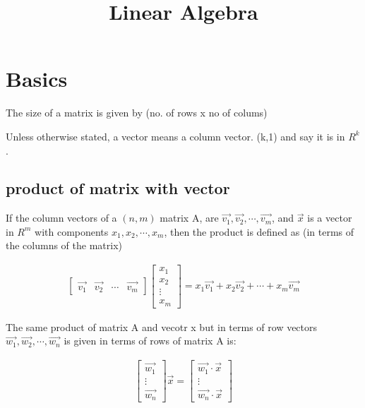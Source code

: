\documentclass[10pt,a4paper]{article}
\title{Linear Algebra}
\begin{document}
	\maketitle

	
	\section{Basics}
	The size of a matrix is given by (no. of rows x no of colums)
	
	Unless otherwise stated, a vector means a column vector. (k,1) and say it is in $R^k$.
	
	\subsection{product of matrix with vector}
	
	If the column vectors of a $(n,m)$ matrix A, are $\vec{v_1}, \vec{v_2}, \cdots, \vec{v_m}$, and $\vec{x}$ is a vector in $R^m$ with components $x_1, x_2, \cdots, x_m$, then the product is defined as (in terms of the columns of the matrix)
	
	\begin{align}
		\begin{bmatrix}
			\vec{v_1} & \vec{v_2} & \cdots & \vec{v_m}
		\end{bmatrix}
		\begin{bmatrix}
			x_1\\
			x_2\\
			\vdots\\
			x_m
		\end{bmatrix}
		= x_1\vec{v_1} + x_2\vec{v_2} + \cdots + x_m\vec{v_m}
	\end{align}
	
	The same product of matrix A and vecotr x but in terms of row vectors $\vec{w_1}, \vec{w_2}, \cdots, \vec{w_n}$ is given in terms of rows of matrix A is:
	
	\begin{align}
		\begin{bmatrix}
			\vec{w_1}\\
			\vdots\\
			\vec{w_n}
		\end{bmatrix}
		\vec{x} = 
		\begin{bmatrix}
			\vec{w_1} \cdot \vec{x}\\
			\vdots\\
			\vec{w_n} \cdot \vec{x}
		\end{bmatrix}	
	\end{align}
	
\end{document}
